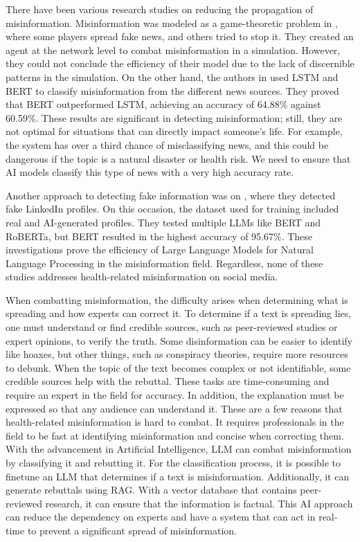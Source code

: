 There have been various research studies on reducing the propagation of misinformation. Misinformation was modeled as a game-theoretic problem in \cite{9906925}, where some players spread fake news, and others tried
to stop it. They created an agent at the network level to combat misinformation in a simulation. However, they could not conclude the efficiency of their model due to the lack of discernible patterns in the simulation. On
the other hand, the authors in \cite{10100054} used LSTM and BERT to classify misinformation from the different news sources. They proved that BERT outperformed LSTM, achieving an accuracy of 64.88\% against 60.59\%. 
These results are significant in detecting misinformation; still, they are not optimal for situations that can directly impact someone's life. For example, the system has over a third chance of misclassifying news, and this could
be dangerous if the topic is a natural disaster or health risk. We need to ensure that AI models classify this type of news with a very high accuracy rate. 

Another approach to detecting fake information was on \cite{Ayoobi_2023}, where they detected fake LinkedIn profiles. On this occasion, the dataset used for training included real and AI-generated profiles. They tested multiple
LLMs like BERT and RoBERTa, but BERT resulted in the highest accuracy of 95.67\%. These investigations prove the efficiency of Large Language Models for Natural Language Processing in the misinformation field. Regardless,
none of these studies addresses health-related misinformation on social media. 

When combatting misinformation, the difficulty arises when determining what is spreading and how experts can correct it. To determine if a text is spreading lies, one must understand or find credible sources,
such as peer-reviewed studies or expert opinions, to verify the truth. Some disinformation can be easier to identify like hoaxes, but other things, such as conspiracy theories, require more resources to debunk.
When the topic of the text becomes complex or not identifiable, some credible sources help with the rebuttal. These tasks are time-consuming and require an expert in the field for accuracy. In addition, the
explanation must be expressed so that any audience can understand it. These are a few reasons that health-related misinformation is hard to combat. It requires professionals in the field to be fast at identifying
misinformation and concise when correcting them. With the advancement in Artificial Intelligence, LLM can combat misinformation by classifying it and rebutting it. For the classification process, it is possible to
finetune an LLM that determines if a text is misinformation. Additionally, it can generate rebuttals using RAG. With a vector database that contains peer-reviewed research, it can ensure that the information is factual. 
This AI approach can reduce the dependency on experts and have a system that can act in real-time to prevent a significant spread of misinformation.


